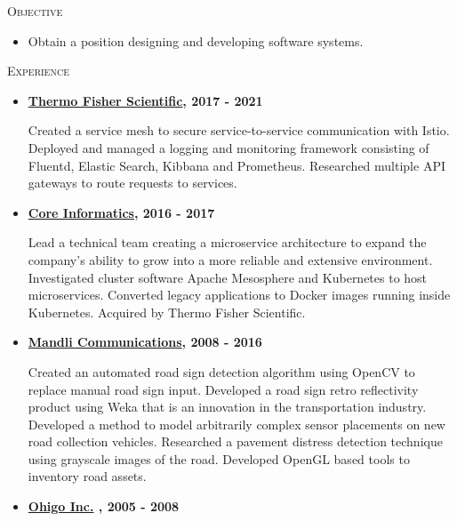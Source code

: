 \documentclass{article}
\begin{document}
  \begin{description}   
    
  \item \textsc{Objective}
    \begin{itemize}
    \item Obtain a position designing and developing software systems.
    \end{itemize}
    
    
  \item \textsc{Experience}
    
    \begin{itemize}

    \item
      \textbf{\href{http://www.thermofisher.com} {Thermo Fisher Scientific}, 2017 - 2021}

      Created a service mesh to secure service-to-service communication with Istio.  Deployed and managed a logging and
      monitoring framework consisting of Fluentd, Elastic Search, Kibbana and Prometheus. Researched multiple API gateways 
      to route requests to services.
      
    \item
      \textbf{\href{http://coreinformatics.com} {Core Informatics}, 2016 - 2017}

      Lead a technical team creating a microservice architecture to expand the company's ability to grow into a more reliable
      and extensive environment.  Investigated cluster software Apache Mesosphere and Kubernetes to host
      microservices.  Converted legacy applications to Docker images running inside Kubernetes.  Acquired
      by Thermo Fisher Scientific.
      
      
    \item
      \textbf{\href{http://www.mandli.com} {Mandli Communications}, 2008 - 2016}

      Created an automated road sign detection algorithm using OpenCV to replace manual road sign input.  
      Developed a road sign retro reflectivity product using Weka that is an innovation in the transportation industry. 
      Developed a method to model arbitrarily complex sensor placements on new road collection vehicles.
      Researched a pavement distress detection technique using grayscale images of the road.  
      Developed OpenGL based tools to inventory road assets.

    \item
      \textbf{\href{https://ppubs.uspto.gov/dirsearch-public/print/downloadPdf/20080249982} {Ohigo Inc.} , 2005 - 2008}
    

\end{itemize}
\end{description}
\end{document}
